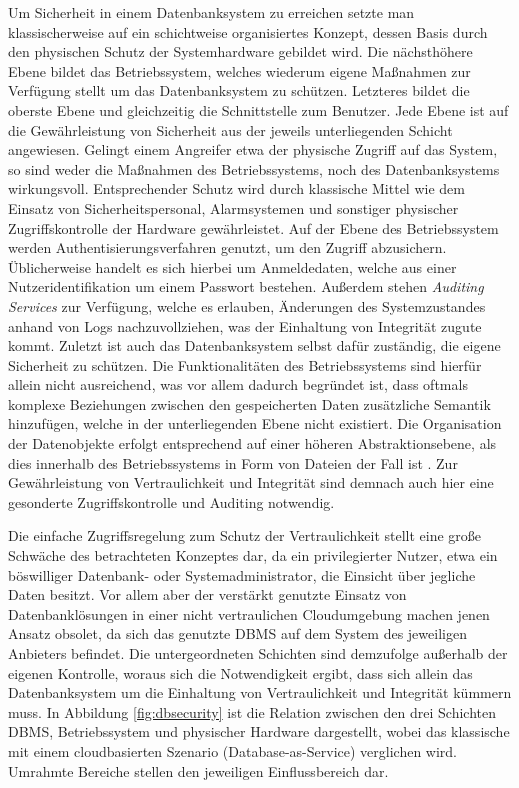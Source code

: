 Um Sicherheit in einem Datenbanksystem zu erreichen setzte man klassischerweise auf ein schichtweise organisiertes Konzept, dessen Basis durch den physischen Schutz der Systemhardware gebildet wird. Die nächsthöhere Ebene bildet das Betriebssystem, welches wiederum eigene Maßnahmen zur Verfügung stellt um das Datenbanksystem zu schützen. Letzteres bildet die oberste Ebene und gleichzeitig die Schnittstelle zum Benutzer. Jede Ebene ist auf die Gewährleistung von Sicherheit aus der jeweils unterliegenden Schicht angewiesen. Gelingt einem Angreifer etwa der physische Zugriff auf das System, so sind weder die Maßnahmen des Betriebssystems, noch des Datenbanksystems wirkungsvoll. Entsprechender Schutz wird durch klassische Mittel wie dem Einsatz von Sicherheitspersonal, Alarmsystemen und sonstiger physischer Zugriffskontrolle der Hardware gewährleistet. Auf der Ebene des Betriebssystem werden Authentisierungsverfahren genutzt, um den Zugriff abzusichern. Üblicherweise handelt es sich hierbei um Anmeldedaten, welche aus einer Nutzeridentifikation um einem Passwort bestehen. Außerdem stehen \textit{Auditing Services} zur Verfügung, welche es erlauben, Änderungen des Systemzustandes anhand von Logs nachzuvollziehen, was der Einhaltung von Integrität zugute kommt. Zuletzt ist auch das Datenbanksystem selbst dafür zuständig, die eigene Sicherheit zu schützen. Die Funktionalitäten des Betriebssystems sind hierfür allein nicht ausreichend, was vor allem dadurch begründet ist, dass oftmals komplexe Beziehungen zwischen den gespeicherten Daten zusätzliche Semantik hinzufügen, welche in der unterliegenden Ebene nicht existiert. Die Organisation der Datenobjekte erfolgt entsprechend auf einer höheren Abstraktionsebene, als dies innerhalb des Betriebssystems in Form von Dateien der Fall ist \cite{Vimercati2001}. Zur Gewährleistung von Vertraulichkeit und Integrität sind demnach auch hier eine gesonderte Zugriffskontrolle und Auditing notwendig.

Die einfache Zugriffsregelung zum Schutz der Vertraulichkeit stellt eine große Schwäche des betrachteten Konzeptes dar, da ein privilegierter Nutzer, etwa ein böswilliger Datenbank- oder Systemadministrator, die Einsicht über jegliche Daten besitzt. Vor allem aber der verstärkt genutzte Einsatz von Datenbanklösungen in einer nicht vertraulichen Cloudumgebung machen jenen Ansatz obsolet, da sich das genutzte \ac{DBMS} auf dem System des jeweiligen Anbieters befindet. Die untergeordneten Schichten sind demzufolge außerhalb der eigenen Kontrolle, woraus sich die Notwendigkeit ergibt, dass sich allein das Datenbanksystem um die Einhaltung von Vertraulichkeit und Integrität kümmern muss. In Abbildung \ref{fig:dbsecurity} ist die Relation zwischen den drei Schichten \ac{DBMS}, Betriebssystem und physischer Hardware dargestellt, wobei das klassische mit einem cloudbasierten Szenario (Database-as-Service) verglichen wird. Umrahmte Bereiche stellen den jeweiligen Einflussbereich dar.


